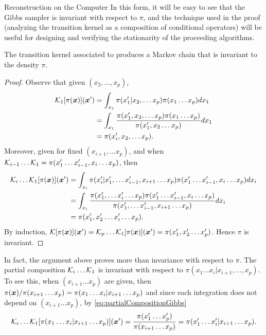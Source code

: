 \begin{chapter}{Reconstruction on the Computer}
In this form, it will be easy to see that the Gibbs sampler is invariant with respect to $\pi$, and the technique used in the proof (analyzing the transition kernel as a composition of conditional operators) will be useful for designing and verifying the stationarity of the proceeding algorithms.
\begin{prop} The transition kernel associated to  produces a Markov chain that is invariant to the density $\pi$.
\end{prop}
\begin{proof}
  Observe that given $(x_2,\dots,x_p)$,
  \begin{align}
    \mathcal K_1[\pi(\mbox{\boldmath$x$})](\mbox{\boldmath$x$}') 
      &=\int_{x_1} \pi(x_1'|x_2,\dots x_p) \pi(x_1\dots x_p)dx_1\nonumber\\
      &=\int_{x_1} \frac{\pi(x_1',x_2,\dots x_p) \pi(x_1\dots x_p)}{\pi(x_1',x_2\dots x_p)}dx_1\nonumber\\
      &=\pi(x_i',x_2,\dots x_p).
  \end{align}
  Moreover, given for fixed $(x_{i+1},\dots x_p)$, and when $\mathcal K_{i-1} \dots  \mathcal K_1 = \pi(x_1'\dots x_{i-1}',x_i\dots x_p)$, then
  \begin{align}
    \mathcal K_i \dots  \mathcal K_1[\pi(\mbox{\boldmath$x$})](\mbox{\boldmath$x$}') 
      &=\int_{x_i} \pi(x_i'|x_1',\dots x_{i-1}',x_{i+1}\dots x_p) \pi(x_1'\dots x_{i-1}',x_i\dots x_p)dx_i\nonumber\\
      &=\int_{x_i} \frac{\pi(x_1',\dots x_{i}'\dots x_p) \pi(x_1'\dots x_{i-1}',x_i\dots x_p)}{\pi(x_1',\dots x_{i-1}',x_{i+1}\dots x_p)}dx_i\nonumber\\
      &=\pi(x_1',x_2' \dots x_i'\dots x_p).\label{eq:partialCompositionGibbs}
  \end{align}
  By induction, $\mathcal K [\pi(\mbox{\boldmath$x$})](\mbox{\boldmath$x$}') = \mathcal K_p\dots \mathcal K_1 [\pi(\mbox{\boldmath$x$})](\mbox{\boldmath$x$}') = \pi(x_1',x_2'\dots x_p')$.
  Hence $\pi$ is invariant.
\end{proof}
In fact, the argument above proves more than invariance with respect to $\pi$.
The partial composition $\mathcal K_i\dots\mathcal K_1$ is invariant with respect to $\pi(x_1\dots x_i|x_{i+1},\dots,x_p)$. 
To see this, when $(x_{i+1}\dots x_p)$ are given, then $\pi(\mbox{\boldmath$x$})/\pi(x_{i+1}\dots x_p)= \pi(x_1\dots x_{i}|x_{i+1}\dots x_p)$ and since each integration does not depend on $(x_{i+1}\dots x_p)$, by \eqref{eq:partialCompositionGibbs}
\begin{equation} \label{eq:conditionalInvariance}
  \K_i\dots \K_1 [\pi(x_1\dots x_i|x_{i+1}\dots x_p)](\vect x') 
  = \frac{\pi(x_1'\dots x_p')}{\pi(x_{i+1}\dots x_p)} = \pi(x_1'\dots x_i'|x_{i+1}\dots x_p).

\end{equation}
\end{chapter}
